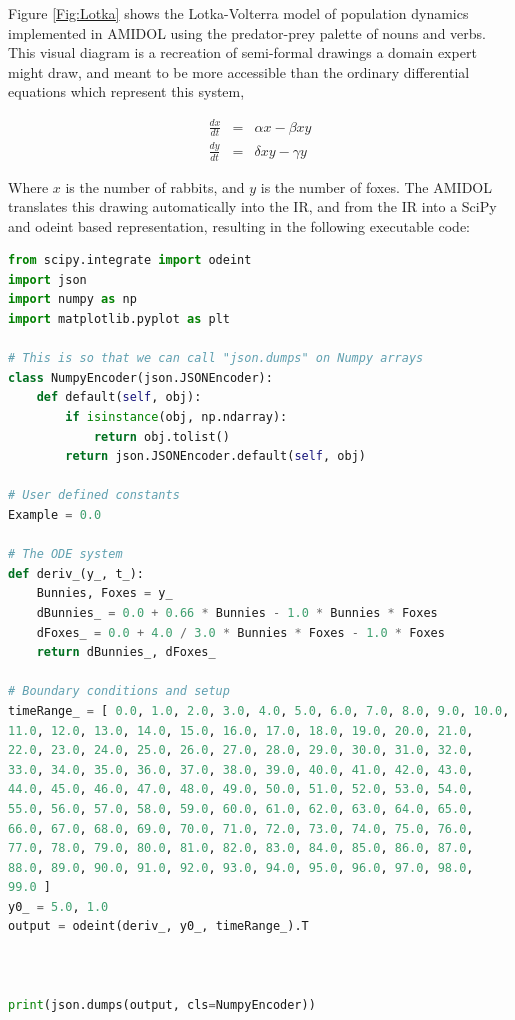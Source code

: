 \documentclass[11pt]{article}
\newcommand{\amidol}{\textsc{AMIDOL}}
\begin{document}
Figure \ref{Fig:Lotka} shows the Lotka-Volterra model of population dynamics implemented in \amidol{} using the predator-prey palette of nouns and verbs.  This visual diagram is a recreation of semi-formal drawings a domain expert might draw, and meant to be more accessible than the ordinary differential equations which represent this system,

\begin{eqnarray}
  \frac{dx}{dt} &=& \alpha x - \beta x y\\
  \frac{dy}{dt} &=& \delta x y - \gamma y
\end{eqnarray}

Where $x$ is the number of rabbits, and $y$ is the number of foxes.  The \amidol{} translates this drawing automatically into the IR, and from the IR into a SciPy and odeint based representation, resulting in the following executable code:

\begin{lstlisting}[language=python]
  from scipy.integrate import odeint
import json
import numpy as np
import matplotlib.pyplot as plt

# This is so that we can call "json.dumps" on Numpy arrays
class NumpyEncoder(json.JSONEncoder):
    def default(self, obj):
        if isinstance(obj, np.ndarray):
            return obj.tolist()
        return json.JSONEncoder.default(self, obj)

# User defined constants
Example = 0.0

# The ODE system
def deriv_(y_, t_):
    Bunnies, Foxes = y_
    dBunnies_ = 0.0 + 0.66 * Bunnies - 1.0 * Bunnies * Foxes
    dFoxes_ = 0.0 + 4.0 / 3.0 * Bunnies * Foxes - 1.0 * Foxes
    return dBunnies_, dFoxes_

# Boundary conditions and setup
timeRange_ = [ 0.0, 1.0, 2.0, 3.0, 4.0, 5.0, 6.0, 7.0, 8.0, 9.0, 10.0,
11.0, 12.0, 13.0, 14.0, 15.0, 16.0, 17.0, 18.0, 19.0, 20.0, 21.0,
22.0, 23.0, 24.0, 25.0, 26.0, 27.0, 28.0, 29.0, 30.0, 31.0, 32.0,
33.0, 34.0, 35.0, 36.0, 37.0, 38.0, 39.0, 40.0, 41.0, 42.0, 43.0,
44.0, 45.0, 46.0, 47.0, 48.0, 49.0, 50.0, 51.0, 52.0, 53.0, 54.0,
55.0, 56.0, 57.0, 58.0, 59.0, 60.0, 61.0, 62.0, 63.0, 64.0, 65.0,
66.0, 67.0, 68.0, 69.0, 70.0, 71.0, 72.0, 73.0, 74.0, 75.0, 76.0,
77.0, 78.0, 79.0, 80.0, 81.0, 82.0, 83.0, 84.0, 85.0, 86.0, 87.0,
88.0, 89.0, 90.0, 91.0, 92.0, 93.0, 94.0, 95.0, 96.0, 97.0, 98.0,
99.0 ]
y0_ = 5.0, 1.0
output = odeint(deriv_, y0_, timeRange_).T



print(json.dumps(output, cls=NumpyEncoder))
\end{lstlisting}
\end{document}
